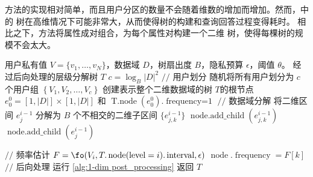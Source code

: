 \de 方法的实现相对简单，而且用户分区的数量不会随着维数的增加而增加。然而，\de 中的 \myahead 树在高维情况下可能非常大，从而使得树的构建和查询回答过程变得耗时。
相比之下，\lle 方法将属性成对组合，为每个属性对构建一个二维 \myahead 树，使得每棵树的规模不会太大。
\begin{algorithm}[!h]
    \caption{构建二维\myahead 层级分解树}
    \label{Construct 2-dim prototype tree}
	\begin{algorithmic}[1]
        \REQUIRE 用户私有值 $V=\{v_1, \ldots, v_N\}$，数据域 $D$，树扇出度 $B$，隐私预算 $\epsilon$，阈值 $\theta$。
        \ENSURE 经过后向处理的\myahead 层级分解树 $T$
		\STATE $c = {\log_B}|D|^2$
        \STATE $//$ 用户划分
        \STATE 随机将所有用户划分为 $c$ 个用户组 $\left\{ V_1, V_2, \ldots, V_c \right\}$
        \STATE 创建表示整个二维数据域的树 $T$的根节点 $e^0_0 = [1, |D|] \times [1, |D|]$ 和 $\operatorname{T.node}(e^0_0).\operatorname{frequency = 1}$
            \STATE $//$ 数据域分解
            \STATE 将二维区间 $e^{i-1}_j$ 分解为 $B$ 个不相交的二维子区间 $\{e^{i-1}_{j,k}\}$
    		\STATE $\operatorname{node.add\_child}(e^{i-1}_{j,k})$
            \ENDFOR
            \ELSE
            \STATE $\operatorname{node.add\_child}(e^{i-1}_{j})$
            \ENDIF 		
            \ENDFOR

            \STATE $//$ 频率估计
            \STATE $F = \fo(V_i, T.\operatorname{node}(\operatorname{level}=i).\operatorname{interval}, \epsilon)$
    		\STATE $\operatorname{node}.\operatorname{frequency} = F[k]$
            \ENDFOR
        \ENDFOR
        \STATE $//$ 后向处理
        \STATE 运行 \autoref{alg:1-dim post_processing}
        \STATE 返回 $T$
	\end{algorithmic}
\end{algorithm}

